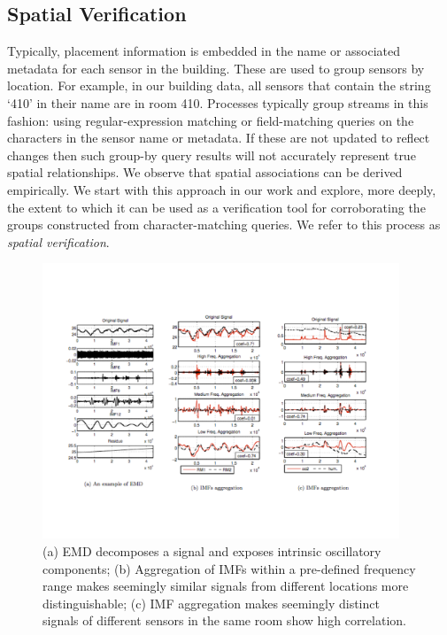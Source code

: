 

\subsection{Spatial Verification}

Typically, placement information is embedded in the name or associated metadata for each sensor in the building.
These are used to group sensors by location.  For example, in our building data, all sensors that contain the string
 `410' in their name are in room 410.  Processes typically group streams in this fashion: using regular-expression matching 
or field-matching queries on the characters in the sensor name or metadata.  If these are not updated to reflect changes
then such group-by query results will not accurately represent true spatial relationships.  
We observe that spatial associations can be derived empirically.  We start with this approach in our 
work and explore, more deeply, the extent to which it can be used 
as a verification tool for corroborating the groups constructed from character-matching queries.  We refer
to this process as \emph{spatial verification}.


\begin{figure}[ht!]
\centering
    \includegraphics[width=0.95\textwidth]{figs/IMFReAggExample}
\caption{(a) EMD decomposes a signal and exposes intrinsic oscillatory components; (b) Aggregation of IMFs within a pre-defined frequency range makes seemingly similar signals from different locations more distinguishable; (c) IMF aggregation makes seemingly distinct signals of different sensors in the same room show high correlation.}
\end{figure}

